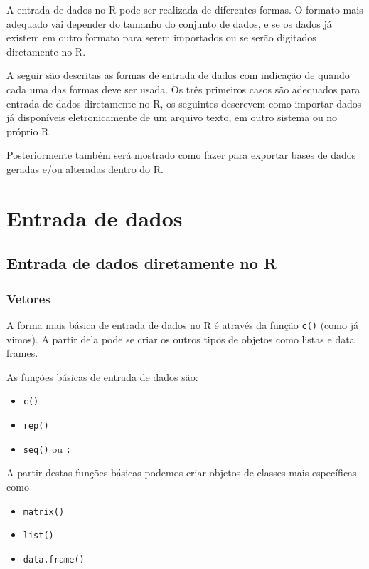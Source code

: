 \documentclass[10pt,a4paper]{book}
\providecommand{\tightlist}{%
  \setlength{\itemsep}{0pt}\setlength{\parskip}{0pt}}
\begin{document}
A entrada de dados no R pode ser realizada de diferentes formas. O
formato mais adequado vai depender do tamanho do conjunto de dados, e se
os dados já existem em outro formato para serem importados ou se serão
digitados diretamente no R.

A seguir são descritas as formas de entrada de dados com indicação de
quando cada uma das formas deve ser usada. Os três primeiros casos são
adequados para entrada de dados diretamente no R, os seguintes descrevem
como importar dados já disponíveis eletronicamente de um arquivo texto,
em outro sistema ou no próprio R.

Posteriormente também será mostrado como fazer para exportar bases de
dados geradas e/ou alteradas dentro do R.

\section{Entrada de dados}\label{entrada-de-dados}

\subsection{Entrada de dados diretamente no
R}\label{entrada-de-dados-diretamente-no-r}

\subsubsection{Vetores}\label{vetores}

A forma mais básica de entrada de dados no R é através da função
\texttt{c()} (como já vimos). A partir dela pode se criar os outros
tipos de objetos como listas e data frames.

As funções básicas de entrada de dados são:

\begin{itemize}
\tightlist
\item
  \texttt{c()}
\item
  \texttt{rep()}
\item
  \texttt{seq()} ou \texttt{:}
\end{itemize}

A partir destas funções básicas podemos criar objetos de classes mais
específicas como

\begin{itemize}
\tightlist
\item
  \texttt{matrix()}
\item
  \texttt{list()}
\item
  \texttt{data.frame()}
\end{itemize}
\end{document}
